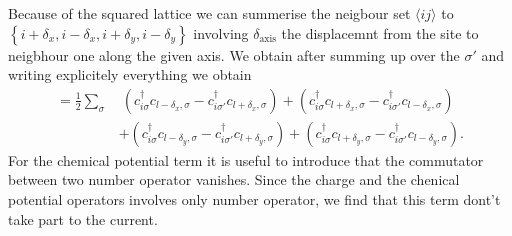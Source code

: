 \documentclass[../main.tex]{subfile}
\begin{document}
Because of the squared lattice we can summerise the neigbour set $\langle ij\rangle$ to $\left\{ i + \delta_x , i - \delta_x, i + \delta_y, i - \delta_y   \right\}$ involving
$\delta_{\text{axis}}$ the displacemnt from the site to neigbhour one along the given axis.
We obtain after summing up over the $\sigma'$ and writing explicitely everything we obtain 
\begin{equation*}
    \begin{aligned}
        =\frac{1}{2} \sum_{\sigma} 
       &~(c_{i\sigma}^{\dagger}c_{l-\delta_x,\sigma} -c_{i\sigma'}^{\dagger}c_{l+\delta_x,\sigma})  
       +(c_{i\sigma}^{\dagger}c_{l+\delta_x,\sigma} -c_{i\sigma'}^{\dagger}c_{l-\delta_x,\sigma})\\
       &+(c_{i\sigma}^{\dagger}c_{l-\delta_y,\sigma} -c_{i\sigma'}^{\dagger}c_{l+\delta_y,\sigma})
       +(c_{i\sigma}^{\dagger}c_{l+\delta_y,\sigma} -c_{i\sigma'}^{\dagger}c_{l-\delta_y,\sigma}).
\end{aligned}
\end{equation*}
For the chemical potential term it is useful to introduce that the commutator between two number operator vanishes. 
Since the charge and the chenical potential operators involves only number operator, we find that this term dont't take part
to the current.
\end{document}
